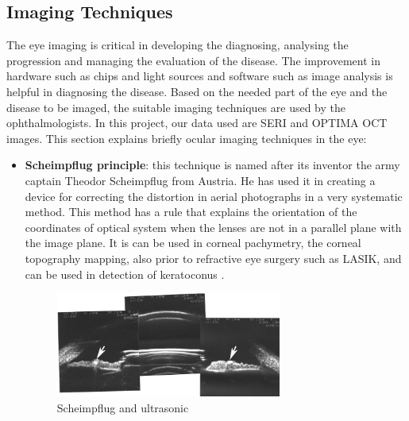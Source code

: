 \subsection{Imaging Techniques}
The eye imaging is critical in developing the diagnosing, analysing the progression and managing the evaluation of the disease.
The improvement in hardware such as chips and light sources and software such as image analysis is helpful in diagnosing the disease.
Based on the needed part of the eye and the disease to be imaged, the suitable imaging techniques are used by the ophthalmologists.
In this project, our data used are SERI and OPTIMA OCT images.
This section explains briefly ocular imaging techniques in the eye:

\begin{itemize}
\item \textbf{Scheimpflug principle}: this technique is named after its inventor the army captain Theodor Scheimpflug from Austria.
He has used it in creating a device for correcting the distortion in aerial photographs in a very systematic method.
This method has a rule that explains the orientation of the coordinates of optical system when the lenses are not in a parallel plane with the image plane.
It is can be used in corneal pachymetry, the corneal topography mapping, also prior to refractive eye surgery such as LASIK, and can be used in detection of keratoconus \cite{hockwin1987measuring}.
\begin{figure}[htb]
        \centering
        \includegraphics[width=0.7\textwidth]{figures/SPultra.jpg} %
  \caption{Scheimpflug and ultrasonic \cite{SF2016}}
  \label{fig:Glaucoma}
\end{figure}


\end{itemize}
